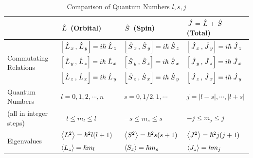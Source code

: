 \documentclass{school-22.101-notes}
\begin{document}
\begin{table}[ht]
  \begin{tabular}{|p{1.5in}|p{1.2in}|p{1.2in}|p{1.2in}|} \hline
    & $\left. \hat{L} \right.$ (Orbital) & $\left. \hat{S} \right.$ (Spin) &$\left. \hat{J} \right. = \left. \hat{L} \right. + \left. \hat{S} \right.$ (Total) \\ \hline
    \multirow{3}{*}{Commutating Relations} &
    $\left[ \left. \hat{L} \right._x, \left. \hat{L} \right._y \right] = i \hbar \left. \hat{L} \right._z$ &  $\left[ \left. \hat{S} \right._x, \left. \hat{S} \right._y \right] = i \hbar \left. \hat{S} \right._z$ &  $\left[ \left. \hat{J} \right._x, \left. \hat{J} \right._y \right] = i \hbar \left. \hat{J} \right._z$ \\
    &  $\left[ \left. \hat{L} \right._y, \left. \hat{L} \right._z \right] = i \hbar \left. \hat{L} \right._x$ &  $\left[ \left. \hat{S} \right._y, \left. \hat{S} \right._z \right] = i \hbar \left. \hat{S} \right._x$ &  $\left[ \left. \hat{J} \right._y, \left. \hat{J} \right._z \right] = i \hbar \left. \hat{J} \right._x$ \\
    &  $\left[ \left. \hat{L} \right._z, \left. \hat{L} \right._x \right] = i \hbar \left. \hat{L} \right._y$ &  $\left[ \left. \hat{S} \right._z, \left. \hat{S} \right._x \right] = i \hbar \left. \hat{S} \right._y$ &  $\left[ \left. \hat{J} \right._z, \left. \hat{J} \right._x \right] = i \hbar \left. \hat{J} \right._y$ \\ \hline
    Quantum Numbers & $ l = 0,1,2,\cdots,n $ & $s = 0, 1/2, 1, \cdots$               & $ j =|l-s|,\cdots, |l+s|$ \\
    (all in integer steps) & $-l \le m_l \le l  $  & $ -s \le m_s \le s$  & $-j \le m_j \le j$  \\ \hline
    \multirow{2}{*}{Eigenvalues} 
    & $\left< L^2 \right> = \hbar^2 l (l+1)$ 
    & $\left< S^2 \right> = \hbar^2 s (s+1)$
    & $\left< J^2 \right> = \hbar^2 j(j+1)$\\ 
    & $\left< L_z \right> = \hbar m_l$ 
    & $\left< S_z \right> = \hbar m_s$ 
    & $\left< J_z \right> =  \hbar m_j$  \\ \hline
  \end{tabular}
  \caption{Comparison of Quantum Numbers $l,s,j$} \label{quantum-numbers}
\end{table}
\end{document}
